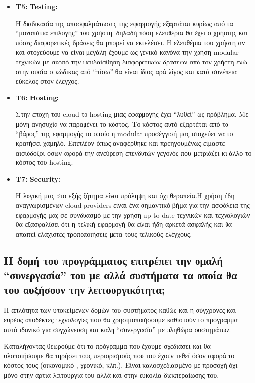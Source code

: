 \documentclass[12pt,a4paper]{article}
\begin{document}
\begin{itemize}
	\item \textbf{Τ5: Testing:}

	Η διαδικασία της αποσφαλμάτωσης της εφαρμογής εξαρτάται κυρίως από τα “μονοπάτια επιλογής” του χρήστη, δηλαδή πόση ελευθέρια θα έχει ο χρήστης και πόσες διαφορετικές δράσεις θα μπορεί να εκτελέσει. Η ελευθέρια του χρήστη αν και στοχεύουμε να είναι μεγάλη έχουμε ως γενικό κανόνα την χρήση modular τεχνικών με σκοπό την ψευδαίσθηση διαφορετικών δράσεων από τον χρήστη ενώ στην ουσία ο κώδικας από “πίσω” θα είναι ίδιος αρά λίγος και κατά συνέπεια εύκολος στον έλεγχος.

	\item \textbf{Τ6: Hosting:}

	Στην εποχή του cloud το hosting μιας εφαρμογής έχει “λυθεί” ως πρόβλημα. Με μόνη ανησυχία να παραμένει το κόστος. Το κόστος αυτό εξαρτάται από το “βάρος” της εφαρμογής το οποίο η modular προσέγγισή μας στοχεύει να το κρατήσει χαμηλό. Επιπλέον όπως αναφέρθηκε και προηγουμένως είμαστε αισιόδοξοι όσων αφορά την ανεύρεση επενδυτών γεγονός που μετριάζει κι άλλο το κόστος του hosting.

	\item \textbf{T7: Security:}

	Η λογική μας στο εξής ζήτημα είναι πρόληψη και όχι θεραπεία.H χρήση ήδη αναγνωρισμένων cloud providers είναι ένα σημαντικό βήμα για την ασφάλεια της εφαρμογής μας σε συνδυασμό με την χρήση up to date τεχνικών και τεχνολογιών θα εξασφαλίσει ότι η τελική εφαρμογή θα είναι ήδη αρκετά ασφαλής και θα απαιτεί ελάχιστες τροποποιήσεις μετα τους τελικούς ελέγχους.
\end{itemize}

\subsection{Η δομή του προγράμματος επιτρέπει την ομαλή “συνεργασία” του με αλλά συστήματα τα οποία θα του αυξήσουν την λειτουργικότητα;}

Η απλότητα των υποκείμενων δομών του συστήματος καθώς και η σύγχρονες και ευρέος αποδέκτες τεχνολογίες που θα χρησιμοποιήσουμε καθιστούν το πρόγραμμα αυτό ιδανικό για συγχώνευση και καλή “συνεργασία” με πληθώρα συστημάτων.

Καταλήγοντας θεωρούμε ότι το πρόγραμμα που έχουμε σχεδιάσει και θα υλοποιήσουμε θα τηρήσει τους περιορισμούς που του έχουν τεθεί όσον αφορά το κόστος τους (οικονομικό , χρονικό, κλπ.). Είναι καλοσχεδιασμένο με προσοχή όχι μόνο στην άρτια λειτουργία του αλλά και στην ευκολία διεκπεραίωσης του.
\end{document}

